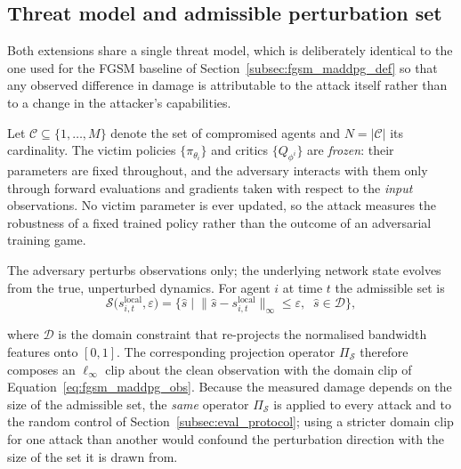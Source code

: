 
\subsection{Threat model and admissible perturbation set}
\label{subsec:threat_model_pgd}

Both extensions share a single threat model, which is deliberately identical to the
one used for the FGSM baseline of Section~\ref{subsec:fgsm_maddpg_def} so that any
observed difference in damage is attributable to the attack itself rather than to a
change in the attacker's capabilities.

Let $\mathcal{C} \subseteq \{1,\dots,M\}$ denote the set of compromised agents and
$N = |\mathcal{C}|$ its cardinality. The victim policies $\{\pi_{\theta_i}\}$ and
critics $\{Q_{\phi^i}\}$ are \emph{frozen}: their parameters are fixed throughout,
and the adversary interacts with them only through forward evaluations and
gradients taken with respect to the \emph{input} observations. No victim parameter
is ever updated, so the attack measures the robustness of a fixed trained policy
rather than the outcome of an adversarial training game.

The adversary perturbs observations only; the underlying network state evolves from
the true, unperturbed dynamics. For agent $i$ at time $t$ the admissible set is
\begin{equation}
  \mathcal{S}\big(s_{i,t}^{\text{local}}, \varepsilon\big) =
  \Big\{ \hat{s} \;\Big|\;
    \big\| \hat{s} - s_{i,t}^{\text{local}} \big\|_{\infty} \le \varepsilon,
    \;\; \hat{s} \in \mathcal{D}
  \Big\},
  \label{eq:admissible_set}
\end{equation}

\noindent where $\mathcal{D}$ is the domain constraint that re-projects the
normalised bandwidth features onto $[0,1]$. The corresponding projection operator
$\Pi_{\mathcal{S}}$ therefore composes an $\ell_{\infty}$ clip about the clean
observation with the domain clip of Equation~\eqref{eq:fgsm_maddpg_obs}. Because
the measured damage depends on the size of the admissible set, the \emph{same}
operator $\Pi_{\mathcal{S}}$ is applied to every attack and to the random control
of Section~\ref{subsec:eval_protocol}; using a stricter domain clip for one attack
than another would confound the perturbation direction with the size of the set it
is drawn from.

